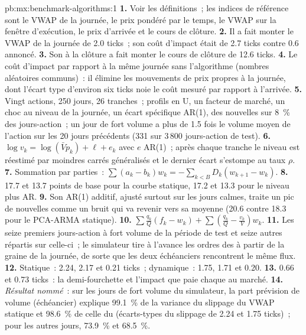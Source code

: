 \begin{solution}{pb:mx:benchmark-algorithms:1}
\textbf{1.} Voir les définitions~; les indices de référence sont le VWAP de la journée, le prix pondéré par le temps, le VWAP sur la fenêtre d'exécution, le prix d'arrivée
et le cours de clôture.
\textbf{2.} Il a fait monter le VWAP de la journée de 2.0 ticks~; son coût d'impact était de 2.7 ticks contre 0.6 annoncé.
\textbf{3.} Son  à la clôture a fait monter le cours de clôture de 12.6 ticks.
\textbf{4.} Le coût d'impact par rapport à la même journée sans l'algorithme (nombres aléatoires communs)~: il élimine les mouvements de prix propres à la journée, dont l'écart type
d'environ six ticks noie le coût mesuré par rapport à l'arrivée.
\textbf{5.} Vingt actions, 250 jours, 26 tranches~; profils en U, un facteur de marché, un choc au niveau de la journée, un écart spécifique AR(1), des nouvelles sur 8~\% des
jours-action~; un jour de fort volume a plus de 1.5 fois le volume moyen de l'action sur les 20 jours précédents (331 sur 3\,800 jours-action de test).
\textbf{6.} $\log v_k=\log(\bar Vp_k)+\ell+e_k$ avec $e$ AR(1)~; après chaque tranche le niveau est réestimé par moindres carrés généralisés et le dernier
écart s'estompe au taux $\rho$.
\textbf{7.} Sommation par parties~: $\sum(a_k-b_k)w_k=-\sum_{k<B}D_k(w_{k+1}-w_k)$.
\textbf{8.} 17.7 et 13.7 points de base pour la courbe statique, 17.2 et 13.3 pour le niveau plus AR.
\textbf{9.} Son AR(1) additif, ajusté surtout sur les jours calmes, traite un pic de nouvelles comme un bruit qui va revenir vers sa moyenne (20.6 contre 18.3 pour le PCA-ARMA statique).
\textbf{10.} $\sum\frac{q_k}{Q}(f_k-w_k)+\sum(\frac{q_k}{Q}-\frac{v_k}{V})w_k$.
\textbf{11.} Les seize premiers jours-action à fort volume de la période de test et seize autres répartis sur celle-ci~; le simulateur tire à l'avance les
ordres des  à partir de la graine de la journée, de sorte que les deux échéanciers rencontrent le même flux.
\textbf{12.} Statique~: 2.24, 2.17 et 0.21 ticks~; dynamique~: 1.75, 1.71 et 0.20.
\textbf{13.} 0.66 et 0.73 ticks~: la demi-fourchette et l'impact que paie chaque  au marché.
\textbf{14.} \emph{Résultat nommé}~: sur les jours de fort volume du simulateur, la part prévision de volume (échéancier) explique 99.1~\% de la variance du slippage du VWAP statique
et 98.6~\% de celle du  (écarts-types du slippage de 2.24 et 1.75 ticks)~; pour les autres jours, 73.9~\% et 68.5~\%.

\end{solution}
